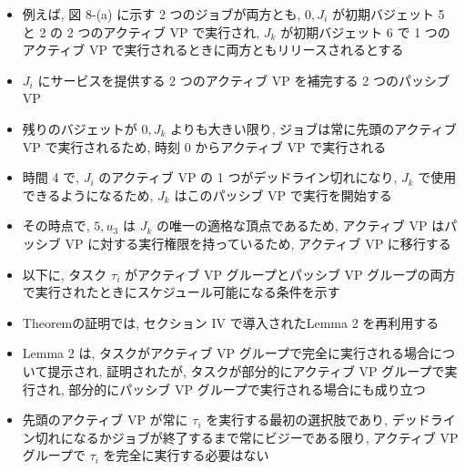 \begin{frame}{}
    \begin{itemize}
        \item 例えば, 図 8-(a) に示す 2 つのジョブが両方とも, $0, J_{i}$ が初期バジェット 5 と 2 の 2 つのアクティブ VP で実行され, $J_{k}$ が初期バジェット 6 で 1 つのアクティブ VP で実行されるときに両方ともリリースされるとする
        \item $J_{i}$ にサービスを提供する 2 つのアクティブ VP を補完する 2 つのパッシブ VP
        \item 残りのバジェットが $0, J_{k}$ よりも大きい限り, ジョブは常に先頭のアクティブ VP で実行されるため, 時刻 0 からアクティブ VP で実行される
        \item 時間 4 で,  $J_{i}$ のアクティブ VP の 1 つがデッドライン切れになり, $J_{k}$ で使用できるようになるため, $J_{k}$ はこのパッシブ VP で実行を開始する
        \item その時点で, $5, u_{3}$ は $J_{k}$ の唯一の適格な頂点であるため, アクティブ VP はパッシブ VP に対する実行権限を持っているため, アクティブ VP に移行する
    \end{itemize}
\end{frame}

\begin{frame}{}
    \begin{itemize}
        \item 以下に, タスク $\tau_{i}$ がアクティブ VP グループとパッシブ VP グループの両方で実行されたときにスケジュール可能になる条件を示す
        \item Theoremの証明では, セクション IV で導入されたLemma 2 を再利用する
        \item Lemma 2 は, タスクがアクティブ VP グループで完全に実行される場合について提示され, 証明されたが, タスクが部分的にアクティブ VP グループで実行され, 部分的にパッシブ VP グループで実行される場合にも成り立つ
        \item 先頭のアクティブ VP が常に $\tau_{i}$ を実行する最初の選択肢であり, デッドライン切れになるかジョブが終了するまで常にビジーである限り, アクティブ VP グループで $\tau_{i}$ を完全に実行する必要はない
    \end{itemize}
\end{frame}

